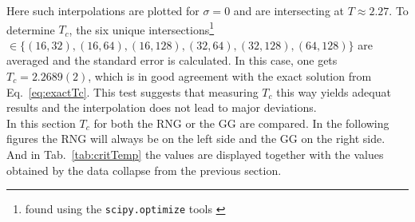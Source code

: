     Here such interpolations are plotted for \(\sigma=0\) and are
    intersecting at \(T \approx 2.27\).
    To determine \(T_c\), the six unique intersections\footnote{found using the \texttt{scipy.optimize} tools \cite{scipy2001}} \(\in \{(16,32),(16,64),(16,128),(32,64),(32,128),(64,128)\}\)
    are averaged and the standard error is calculated. In this case, one
    gets \(T_c = 2.2689(2)\), which is in good agreement with the
    exact solution from Eq.\ \eqref{eq:exactTc}.
    This test suggests that measuring \(T_c\) this way yields
    adequat results and the interpolation does not lead to major
    deviations.\\
    In this section \(T_c\) for both the RNG or the GG are
    compared. In the following figures the RNG will always be on the
    left side and the GG on the right side.
    And in Tab.\ \ref{tab:critTemp} the values are displayed together with the
    values obtained by the data collapse from the previous section.
